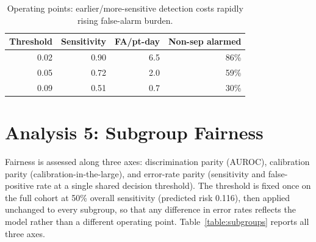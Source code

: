 \begin{table}[H]
    \centering
    \begin{tabular}{r|r|r|r}
        \hline
        \textbf{Threshold} & \textbf{Sensitivity} & \textbf{FA/pt-day} & \textbf{Non-sep alarmed} \\
        \hline\hline
        0.02 & 0.90 & 6.5 & 86\% \\
        0.05 & 0.72 & 2.0 & 59\% \\
        0.09 & 0.51 & 0.7 & 30\% \\
        \hline
    \end{tabular}
    \caption{Operating points: earlier/more-sensitive detection costs rapidly
    rising false-alarm burden.}
    \label{table:alarm_ops}
\end{table}

\section{Analysis 5: Subgroup Fairness}

Fairness is assessed along three axes: discrimination parity (AUROC),
calibration parity (calibration-in-the-large), and error-rate parity
(sensitivity and false-positive rate at a single shared decision threshold).
The threshold is fixed once on the full cohort at 50\% overall sensitivity
(predicted risk 0.116), then applied unchanged to every subgroup, so that any
difference in error rates reflects the model rather than a different operating
point. Table~\ref{table:subgroups} reports all three axes.

